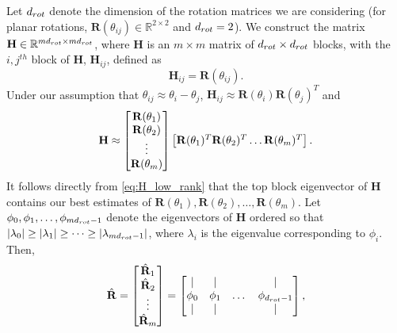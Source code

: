 Let $d_{rot}$ denote the dimension of the rotation matrices we are considering (for planar rotations, $\mathbf{R}(\theta_{ij}) \in \mathbb{R}^{2 \times 2}$ and $d_{rot}=2$).
%
We construct the matrix $\mathbf{H} \in \mathbb{R}^{m d_{rot} \times m d_{rot}}$, where $\mathbf{H}$ is an $m \times m$ matrix of $d_{rot} \times d_{rot}$ blocks, with the $i,j^{th}$ block of $\mathbf{H}$, $\mathbf{H}_{ij}$, defined as
\begin{equation} \label{eq:H_to_R}
\mathbf{H}_{ij} = \mathbf{R}(\theta_{ij}).
\end{equation}
%
%
Under our assumption that $\theta_{ij} \approx \theta_i - \theta_j$, $\mathbf{H}_{ij} \approx \mathbf{R}(\theta_i) \mathbf{R}(\theta_j)^T$
 and
\begin{equation} \label{eq:H_low_rank}
	\mathbf{H} \approx
	\begin{bmatrix}
	\mathbf{R}(\theta_1) \\
	\mathbf{R}(\theta_2) \\
	\vdots \\
	\mathbf{R}(\theta_m)
	\end{bmatrix}
	\begin{bmatrix}
	\mathbf{R}(\theta_1)^T \mathbf{R}(\theta_2)^T \dots \mathbf{R}(\theta_m)^T
	\end{bmatrix}.
\end{equation}
%
It follows directly from \eqref{eq:H_low_rank} that the top block eigenvector of $\mathbf{H}$ contains our best estimates of $\mathbf{R}(\theta_1), \mathbf{R}(\theta_2), \dots, \mathbf{R}(\theta_m)$.
%
Let $\phi_0, \phi_1, \dots, \phi_{m d_{rot}-1}$ denote the eigenvectors of $\mathbf{H}$ ordered so that $|\lambda_0| \ge |\lambda_1| \ge \dots \ge |\lambda_{m d_{rot} -1}|$, where $\lambda_i$ is the eigenvalue corresponding to $\phi_i$.
%
Then,
\begin{equation} \label{eq:R_hat}
\hat{\mathbf{R}} =
\begin{bmatrix}
\hat{\mathbf{R}}_1 \\
\hat{\mathbf{R}}_2 \\
\vdots \\
\hat{\mathbf{R}}_m
\end{bmatrix} =
\begin{bmatrix}
| & | & & | \\
\phi_0 & \phi_1 & \dots & \phi_{d_{rot}-1} \\
| & | & & |
\end{bmatrix},
\end{equation}
